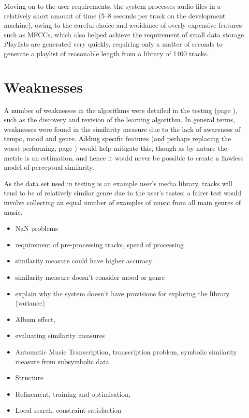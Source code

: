 Moving on to the user requirements, the system processes audio files in a relatively short amount of time (5--8 seconds per track on the development machine), owing to the careful choice and avoidance of overly expensive features such as MFCCs, which also helped achieve the requirement of small data storage. Playlists are generated very quickly, requiring only a matter of seconds to generate a playlist of reasonable length from a library of 1400 tracks.
\section{Weaknesses}
A number of weaknesses in the algorithms were detailed in the testing (page \pageref{text:testing}), such as the discovery and revision of the learning algorithm. In general terms, weaknesses were found in the similarity measure due to the lack of awareness of tempo, mood and genre. Adding specific features (and perhaps replacing the worst performing, page \pageref{text:testing:functional:learner}) would help mitigate this, though as by nature the metric is an estimation, and hence it would never be possible to create a flawless model of perceptual similarity.


As the data set used in testing is an example user's media library, tracks will tend to be of relatively similar genre due to the user's tastes; a fairer test would involve collecting an equal number of examples of music from all main genres of music.
\begin{itemize}
	\item NaN problems
	\item requirement of pre-processing tracks, speed of processing
	\item similarity measure could have higher accuracy
	\item similarity measure doesn't consider mood or genre
	\item explain why the system doesn't have provisions for exploring the library (variance)
\end{itemize}
\begin{itemize}
	\item Album effect, \citet*{Kim2006}
	\item evaluating similarity measures \citet*{Aucouturier2004}
	\item Automatic Music Transcription, transcription problem, symbolic similarity measure from subsymbolic data \citet*{Aucouturier2004}
	\item Structure \citet*{Bruderer2006}
	\item Refinement, training and optimisation, \citet*{Muellensiefen2004}
	\item Local search, constraint satisfaction \citet*{Vossen2005}
\end{itemize}

